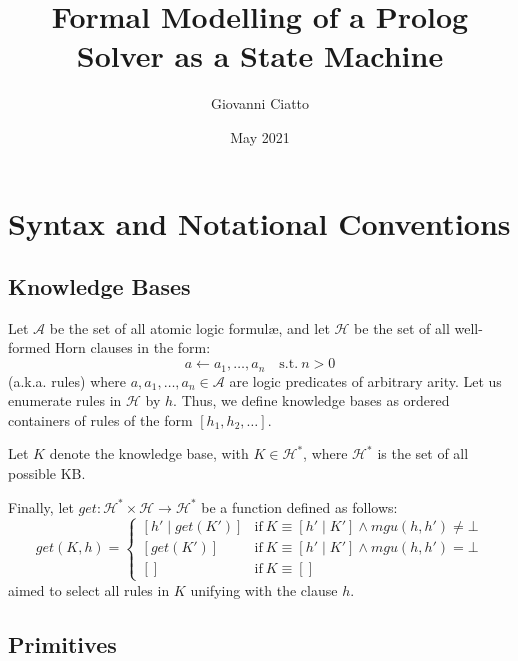 \documentclass{article}
\title{Formal Modelling of a Prolog Solver as a State Machine}
\author{Giovanni Ciatto}
\date{May 2021}
\newcommand{\notableset}[1]{\mathcal{#1}}
\newcommand{\f}[1]{\mathit{#1}}
\newcommand{\fx}[2]{\f{#1}(#2)}
\begin{document}
\maketitle

\section{Syntax and Notational Conventions}

\subsection{Knowledge Bases}

Let $\notableset{A}$ be the set of all atomic logic formul\ae, and let $\notableset{H}$ be the set of all well-formed Horn clauses in the form:
%
\[ a \leftarrow a_1, \ldots, a_n \quad \text{s.t.} \ n > 0\]
%
(a.k.a. rules) where $a, a_1, \ldots, a_n \in \notableset{A}$ are logic predicates of arbitrary arity.
%
Let us enumerate rules in $\notableset{H}$ by $h$.
%
Thus, we define knowledge bases as ordered containers of rules of the form $[h_1, h_2, \ldots]$.

Let $K$ denote the knowledge base, with $K \in \notableset{H}^* $, where $\notableset{H}^*$ is the set of all possible KB.

Finally, let $ \f{get} : \notableset{H}^* \times \notableset{H} \rightarrow \notableset{H}^* $ be a function defined as follows:
%
\[ \fx{get}{K, h} = \begin{cases}
    [h' \mid \fx{get}{K'}] & \text{if}\ K \equiv [h' \mid K'] \wedge \fx{mgu}{h, h'} \neq \bot \\
    [\fx{get}{K'}] & \text{if}\ K \equiv [h' \mid K'] \wedge \fx{mgu}{h, h'} = \bot \\
    [] & \text{if}\ K \equiv []
\end{cases} \]
%
aimed to select all rules in $K$ unifying with the clause $h$.

\subsection{Primitives}
\end{document}
